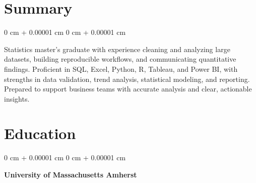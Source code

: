 \documentclass[10pt, letterpaper]{article}
\newenvironment{highlightsforbulletentries}{
    \begin{itemize}[
        topsep=0.10 cm,
        parsep=0.10 cm,
        partopsep=0pt,
        itemsep=0pt,
        leftmargin=10pt
    ]
}{
    \end{itemize}
} %
\newenvironment{onecolentry}{
    \begin{adjustwidth}{
        0 cm + 0.00001 cm
    }{
        0 cm + 0.00001 cm
    }
}{
    \end{adjustwidth}
} %
\begin{document}
    








    \section{Summary} 
        \begin{onecolentry}
         Statistics master's graduate with experience cleaning and analyzing large datasets, building reproducible workflows, and communicating quantitative findings. Proficient in SQL, Excel, Python, R, Tableau, and Power BI, with strengths in data validation, trend analysis, statistical modeling, and reporting. Prepared to support business teams with accurate analysis and clear, actionable insights.
        \end{onecolentry}
        
    \section{Education}

        \begin{onecolentry}
        \textbf{University of Massachusetts Amherst}
        \end{onecolentry}
        
\end{document}
